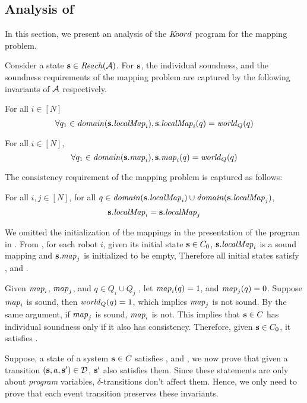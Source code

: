 

\subsection{Analysis of \dmap}
\label{sec:analysis}


In this section, we present an analysis of the $K\kern-2pt oord$ program for the mapping problem.


Consider a state ${\textbf{s}}\in \mathit{Reach}(\mathcal{A})$. For ${\textbf{s}}$, the individual soundness, and the soundness requirements of the mapping problem are captured by the following invariants of $\mathcal{A}$ respectively.


\begin{invariant}
\label{ind-sound}
For all $i \in [N]$ $$\forall q_1 \in \mathit{domain}({\textbf{s}}.\mathit{localMap}_i) , {\textbf{s}}.\mathit{localMap}_i(q) =  \mathit{world}_Q(q)$$
\end{invariant}

\begin{invariant}
\label{sound}
For all $i \in [N]$, $$\forall q_1 \in \mathit{domain}({\textbf{s}}.\mathit{map}_i) , {\textbf{s}}.\mathit{map}_i(q) =  \mathit{world}_Q(q)$$
\end{invariant}

The consistency requirement of the mapping problem is captured as follows:
\begin{invariant}
\label{consistency}
For all $i,j \in [N]$, for all $q \in \mathit{domain}({\textbf{s}}.\mathit{localMap}_i)\cup \mathit{domain}({\textbf{s}}.\mathit{localMap}_j)$, $${\textbf{s}}.\mathit{localMap}_i = {\textbf{s}}.\mathit{localMap}_j$$
\end{invariant}

We omitted the initialization of the mappings in the presentation of the program in . From , for each robot $i$, given its initial state ${\textbf{s}}\in C_0$, ${\textbf{s}}.\mathit{localMap}_i$ is a sound mapping and ${\textbf{s}}.\mathit{map}_j$ is initialized to be empty, Therefore all initial states satisfy , and .


Given $\mathit{map}_i$, $\mathit{map}_j$, and $q\in Q_i \cup Q_j$ , let $\mathit{map}_i(q) = 1$, and $\mathit{map}_j(q) = 0$. Suppose $\mathit{map}_i$ is sound, then $\mathit{world}_Q(q) = 1$, which implies $\mathit{map}_j$ is not sound. By the same argument, if $\mathit{map}_j$ is sound, $\mathit{map}_i$ is not. This implies that ${\textbf{s}}\in C$ has individual soundness only if it also has consistency. Therefore, given ${\textbf{s}}\in C_0$, it satisfies .

Suppose, a state of a system ${\textbf{s}}\in C$ satisfies ,  and  , we now prove that given a transition $({\textbf{s}}, a, {\textbf{s}}')\in \mathcal{D}$, ${\textbf{s}}'$ also satisfies them. Since these statements are only about \emph{program} variables, $\delta$-transitions don't affect them. Hence, we only need to prove that each event transition preserves these invariants.

